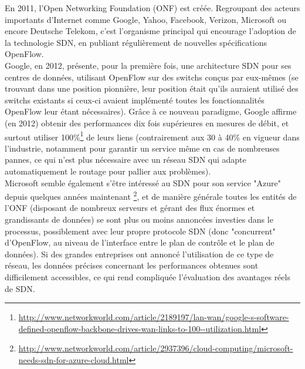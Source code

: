 En 2011, l'Open Networking Foundation (ONF) est créée. Regroupant des acteurs importants d'Internet comme Google, Yahoo, Facebook, Verizon, Microsoft ou encore Deutsche Telekom, c'est l'organisme principal qui encourage l'adoption de la technologie SDN, en publiant régulièrement de nouvelles spécifications OpenFlow.\\

Google, en 2012, présente, pour la première fois, une architecture SDN pour ses centres de données, utilisant OpenFlow sur des switchs conçus par eux-mêmes (se trouvant dans une position pionnière, leur position était qu'ils auraient utilisé des switchs existants si ceux-ci avaient implémenté toutes les fonctionnalités OpenFlow leur étant nécessaires). Grâce à ce nouveau paradigme, Google affirme (en 2012) obtenir des performances dix fois supérieures en mesures de débit, et surtout utiliser 100\%\footnote{\url{http://www.networkworld.com/article/2189197/lan-wan/google-s-software-defined-openflow-back}\newline\url{bone-drives-wan-links-to-100--utilization.html}} de leurs liens (contrairement aux 30 à 40\% en vigueur dans l'industrie, notamment pour garantir un service même en cas de nombreuses pannes, ce qui n'est plus nécessaire avec un réseau SDN qui adapte automatiquement le routage pour pallier aux problèmes).\\

Microsoft semble également s'être intéressé au SDN pour son service "Azure" depuis quelques années maintenant \footnote{\url{http://www.networkworld.com/article/2937396/cloud-computing/microsoft-needs-sdn-for-azure-}\newline\url{cloud.html}}, et de manière générale toutes les entités de l'ONF (disposant de nombreux serveurs et gérant des flux énormes et grandissants de données) se sont plus ou moins annoncées investies dans le processus, possiblement avec leur propre protocole SDN (donc "concurrent" d'OpenFlow, au niveau de l'interface entre le plan de contrôle et le plan de données). Si des grandes entreprises ont annoncé l'utilisation de ce type de réseau, les données précises concernant les performances obtenues sont difficilement accessibles, ce qui rend compliquée l'évaluation des avantages réels de SDN.\\

